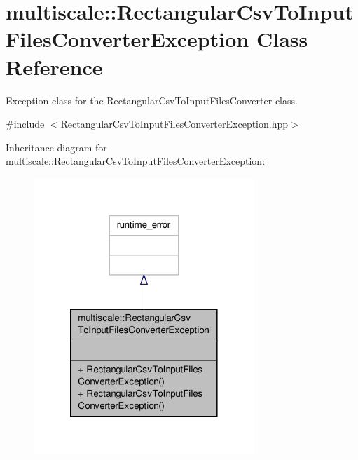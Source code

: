 \hypertarget{classmultiscale_1_1RectangularCsvToInputFilesConverterException}{\section{multiscale\-:\-:Rectangular\-Csv\-To\-Input\-Files\-Converter\-Exception Class Reference}
\label{classmultiscale_1_1RectangularCsvToInputFilesConverterException}
}


Exception class for the Rectangular\-Csv\-To\-Input\-Files\-Converter class.  




{\ttfamily \#include $<$Rectangular\-Csv\-To\-Input\-Files\-Converter\-Exception.\-hpp$>$}



Inheritance diagram for multiscale\-:\-:Rectangular\-Csv\-To\-Input\-Files\-Converter\-Exception\-:\nopagebreak
\begin{figure}[H]
\begin{center}
\leavevmode
\includegraphics[width=236pt]{classmultiscale_1_1RectangularCsvToInputFilesConverterException__inherit__graph}
\end{center}
\end{figure}


